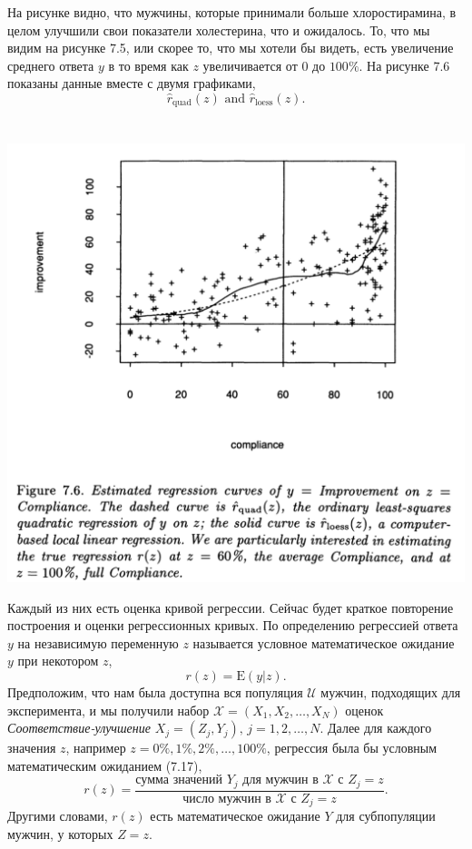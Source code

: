  На рисунке видно, что мужчины, которые принимали больше хлоростирамина, в целом улучшили свои показатели холестерина, что и ожидалось. То, что мы видим на рисунке 7.5, или скорее то, что мы хотели бы видеть, есть увеличение среднего ответа $y$ в то время как $z$ увеличивается от 0 до $100\%$. На рисунке 7.6 показаны данные вместе с двумя графиками,
\begin{equation}
\hat r_\text{quad}(z) \text{ and }  \hat r_\text{loess}(z).
\end{equation}
\\~\\
\noindent
\includegraphics[width=0.9\linewidth]{6/f76.png}
\newline
\setcounter{figure}{7}

Каждый из них есть оценка кривой регрессии. Сейчас будет краткое повторение построения и оценки регрессионных кривых.
По определению регрессией ответа $y$ на независимую переменную $z$ называется условное математическое ожидание $y$ при некотором $z$,
\begin{equation}
  r(z) = \mathrm E(y|z).
\end{equation}
Предположим, что нам была доступна вся популяция $\mathcal U$ мужчин, подходящих для эксперимента, и мы получили набор $\mathcal X = (X_1,X_2,\ldots, X_N)$ оценок \textit{Соответствие-улучшение} $X_j = (Z_j, Y_j),\, j = 1,2,\ldots,N.$ Далее для каждого значения $z$, например $z = 0\%,1\%,2\%,\ldots,100\%$, регрессия была бы условным математическим ожиданием (7.17),
\begin{equation}
  r(z) = \frac{\text{сумма значений $Y_j$ для мужчин в $\mathcal X$ с $Z_j = z$}}{\text{число мужчин в $\mathcal X$ с $Z_j = z$}}.
\end{equation}
 Другими словами, $r(z)$ есть математическое ожидание $Y$ для субпопуляции мужчин, у которых $Z= z$.
 
